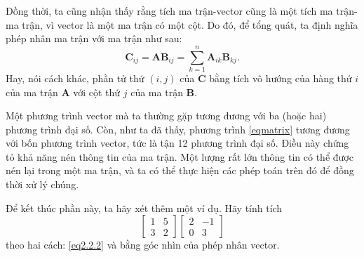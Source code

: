 Đồng thời, ta cũng nhận thấy rằng tích ma trận-vector cũng là một tích ma trận-ma trận, vì vector là một ma trận có một cột. Do đó, để tổng quát, ta định nghĩa phép nhân ma trận với ma trận như sau: 
\begin{equation}
    \mathbf{C}_{ij}=\mathbf{AB}_{ij}=\sum_{k=1}^n \mathbf{A}_{ik}\mathbf{B}_{kj}.
\end{equation}\label{eq2.2.2}
Hay, nói cách khác, phần tử thứ \((i,j)\) của \(\mathbf{C}\) bằng tích vô hướng của hàng thứ \(i\) của ma trận \(\mathbf{A}\) với cột thứ \(j\) của ma trận \(\mathbf{B}\).

Một phương trình vector mà ta thường gặp tương đương với ba (hoặc hai) phương trình đại số. Còn, như ta đã thấy, phương trình \eqref{eqmatrix} tương đương với bốn phương trình vector, tức là tận 12 phương trình đại số. Điều này chứng tỏ khả năng nén thông tin của ma trận. Một lượng rất lớn thông tin có thể được nén lại trong một ma trận, và ta có thể thực hiện các phép toán trên đó để đồng thời xử lý chúng. 
\vspace{8pt}

Để kết thúc phần này, ta hãy xét thêm một ví dụ. Hãy tính tích
\[\begin{bmatrix}
    1&5\\ 3&2
\end{bmatrix}\begin{bmatrix}
    2&-1\\ 0&3
\end{bmatrix}\] theo hai cách: \eqref{eq2.2.2} và bằng góc nhìn của phép nhân vector.


